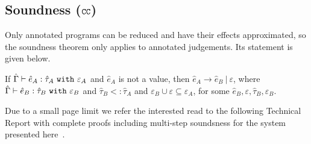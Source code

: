 \subsection{Soundness ($\mathtt{CC}$)} 

Only annotated programs can be reduced and have their effects
approximated, so the soundness theorem only applies to annotated
judgements. Its statement is given below.

\begin{theorem}
If $\hat \Gamma \vdash \hat e_A: \hat \tau_A~\mathtt{with}~ \varepsilon_A$ and $\hat e_A$ is not a value, then $\hat e_A \longrightarrow \hat e_B~|~\varepsilon$, where $\hat \Gamma \vdash \hat e_B: \hat \tau_B~\mathtt{with}~ \varepsilon_B$ and $\hat \tau_B <: \hat \tau_A$ and $\varepsilon_B \cup \varepsilon \subseteq \varepsilon_A$, for some $\hat e_B, \varepsilon, \hat \tau_B, \varepsilon_B$.
\end{theorem}

Due to a small page limit we refer the interested read to the
following Technical Report with complete proofs including multi-step
soundsness for the system presented here~\cite{ecs:2018:aaron-tr}.
